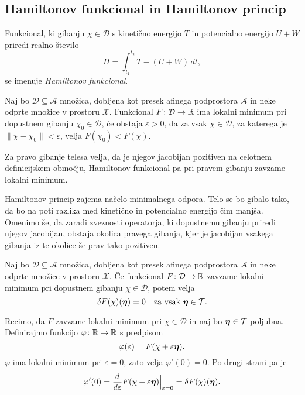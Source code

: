 \subsection{Hamiltonov funkcional in Hamiltonov princip}


\begin{definicija}
	Funkcional, ki gibanju $\chi\in \mathcal{D}$ s kinetično energijo $T$ in potencialno
	energijo $U+W$ priredi realno število
	\[
		H=\int_{t_1}^{t_2}T-(U+W)\,dt,
	\]
	se imenuje \emph{Hamiltonov funkcional}.
\end{definicija}

\begin{definicija}
	Naj bo $\mathcal{D}\subseteq\mathcal{A}$ množica, dobljena kot presek afinega podprostora $\mathcal{A}$ in
	neke odprte množice v prostoru $\mathcal{X}$.
	Funkcional $F\colon \mathcal{D}\to\mathbb R$ ima lokalni minimum pri dopustnem gibanju
	$\chi_{0}\in \mathcal{D}$, če obstaja $\varepsilon >0$,
	da za vsak $\chi\in \mathcal{D}$, za katerega je $\|\chi-\chi_{0}\|<\varepsilon$, velja $F(\chi_{0})<F(\chi)$.
\end{definicija}

\begin{hampri}
	Za pravo gibanje telesa velja, da je njegov jacobijan pozitiven na
	celotnem definicijskem območju, Hamiltonov funkcional pa pri pravem gibanju
	zavzame lokalni minimum.
\end{hampri}

Hamiltonov princip zajema načelo minimalnega odpora. Telo se bo gibalo tako, da
bo na poti razlika med kinetično in potencialno energijo čim manjša. Omenimo še, da zaradi zveznosti operatorja,
ki dopustnemu gibanju priredi njegov jacobijan, obstaja okolica pravega gibanja,
kjer je jacobijan vsakega gibanja iz te okolice še prav tako pozitiven.

\begin{trditev}
	Naj bo $\mathcal{D}\subseteq\mathcal{A}$ množica, dobljena kot presek afinega podprostora $\mathcal{A}$ in
	neke odprte množice v prostoru $\mathcal{X}$.
	Če funkcional $F\colon \mathcal{D}\to\mathbb R$ zavzame lokalni minimum pri dopustnem gibanju $\chi\in\mathcal{D}$, potem velja
	\[ \delta F(\chi)(\vek{\eta})=0\quad\textrm{za vsak}\ \vek{\eta}\in\mathcal{T}. \]
\end{trditev}

\proof
	Recimo, da $F$ zavzame lokalni minimum pri $\chi\in\mathcal{D}$ in naj bo $\boldsymbol \eta\in\mathcal{T}$ poljubna.
	Definirajmo funkcijo $\varphi\colon\mathbb R\to\mathbb R$ s predpisom
	\[ \varphi(\varepsilon)=F(\chi+\varepsilon\boldsymbol \eta). \]
	$\varphi$ ima lokalni minimum pri $\varepsilon=0$, zato velja $\varphi'(0)=0.$
	Po drugi strani pa je
	\[
		\varphi'(0)=\frac{d}{d\varepsilon}F(\chi+\varepsilon\boldsymbol \eta)\Big|_{\varepsilon=0}=
		\delta F(\chi)(\boldsymbol \eta).
	\]
\endproof

